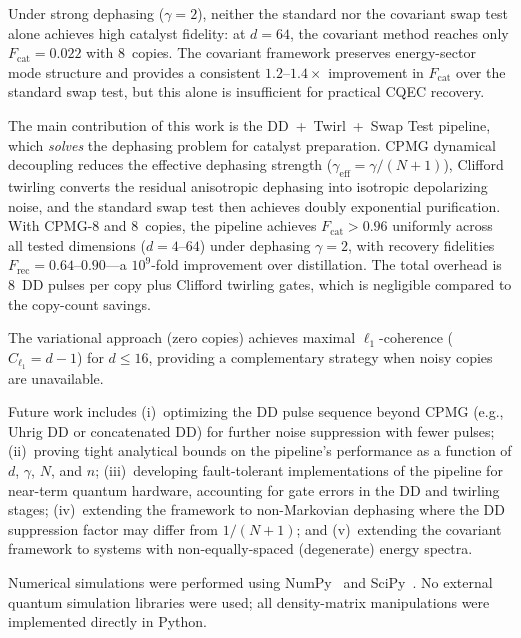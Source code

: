 \documentclass[prx,twocolumn,superscriptaddress,longbibliography,floatfix]{revtex4-2}
\begin{document}
Under strong dephasing ($\gamma = 2$), neither the standard nor the covariant swap test alone achieves high catalyst fidelity: at $d = 64$, the covariant method reaches only $F_\mathrm{cat} = 0.022$ with 8~copies.
The covariant framework preserves energy-sector mode structure and provides a consistent $1.2$--$1.4\times$ improvement in $F_\mathrm{cat}$ over the standard swap test, but this alone is insufficient for practical CQEC recovery.

The main contribution of this work is the DD~+~Twirl~+~Swap Test pipeline, which \emph{solves} the dephasing problem for catalyst preparation.
CPMG dynamical decoupling reduces the effective dephasing strength ($\gamma_\mathrm{eff} = \gamma/(N+1)$), Clifford twirling converts the residual anisotropic dephasing into isotropic depolarizing noise, and the standard swap test then achieves doubly exponential purification.
With CPMG-8 and 8~copies, the pipeline achieves $F_\mathrm{cat} > 0.96$ uniformly across all tested dimensions ($d = 4$--$64$) under dephasing $\gamma = 2$, with recovery fidelities $F_\mathrm{rec} = 0.64$--$0.90$---a $10^9$-fold improvement over distillation.
The total overhead is 8~DD pulses per copy plus Clifford twirling gates, which is negligible compared to the copy-count savings.

The variational approach (zero copies) achieves maximal $\ell_1$-coherence ($C_{\ell_1} = d-1$) for $d \leq 16$, providing a complementary strategy when noisy copies are unavailable.

Future work includes (i)~optimizing the DD pulse sequence beyond CPMG (e.g., Uhrig DD or concatenated DD) for further noise suppression with fewer pulses; (ii)~proving tight analytical bounds on the pipeline's performance as a function of $d$, $\gamma$, $N$, and $n$; (iii)~developing fault-tolerant implementations of the pipeline for near-term quantum hardware, accounting for gate errors in the DD and twirling stages; (iv)~extending the framework to non-Markovian dephasing where the DD suppression factor may differ from $1/(N+1)$; and (v)~extending the covariant framework to systems with non-equally-spaced (degenerate) energy spectra.


\begin{acknowledgments}
Numerical simulations were performed using NumPy~\cite{numpy2020} and SciPy~\cite{scipy2020}.
No external quantum simulation libraries were used; all density-matrix manipulations were implemented directly in Python.
\end{acknowledgments}
\end{document}
